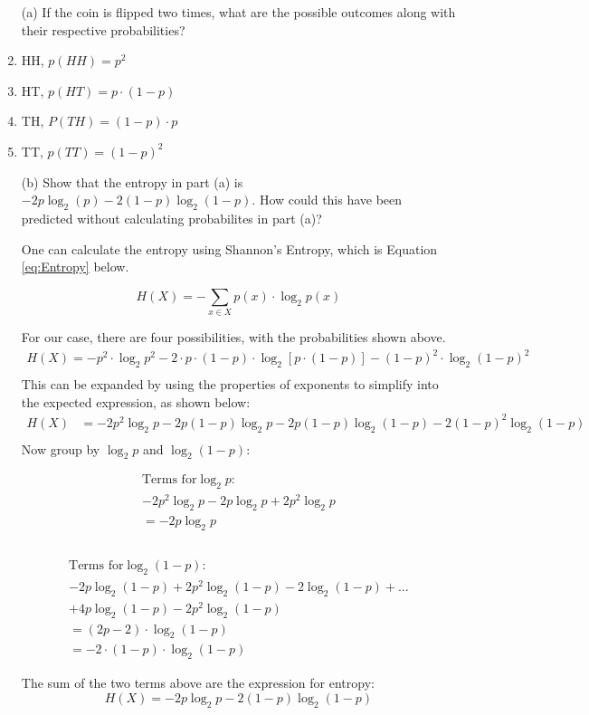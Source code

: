 \documentclass{article}
\begin{document}
    \begin{enumerate}
      \item [(a)] If the coin is flipped two times, what are the possible outcomes along with their respective probabilities?
      
      \item HH, $p(HH) = p^2$
      \item HT, $p(HT) = p \cdot (1-p)$
      \item TH, $P(TH) = (1-p) \cdot p$
      \item TT, $p(TT) = (1-p)^2$
      
      \item [(b)] Show that the entropy in part (a) is $-2p\log_2(p)-2(1-p)\log_{2}(1-p)$. How could this have been predicted without calculating probabilites in part (a)?
      
      One can calculate the entropy using Shannon's Entropy, which is Equation \ref{eq:Entropy} below.
      
      \begin{equation}
      \label{eq:Entropy}
      H(X) = - \sum_{x \in X} p(x) \cdot \log_2 p(x)
      \end{equation}

For our case, there are four possibilities, with the probabilities shown above.
	\begin{align*}
	H(X) = - p^2 \cdot \log_2 p^2 - 2 \cdot p \cdot (1-p) \cdot \log_2 [p \cdot (1-p)] - (1-p)^2 \cdot \log_2 (1-p)^2 \\
	\end{align*}
This can be expanded by using the properties of exponents to simplify into the expected expression, as shown below:
\begin{align*}
H(X) &= -2  p^2 \log_2 p - 2  p  (1-p)  \log_2 p - 2  p  (1-p) \log_2 (1-p) - 2  (1-p)^2  \log_2 (1-p) \\
\end{align*}
Now group by $\log_2p$ and $\log_2(1-p)$:

\begin{minipage}{.5\textwidth}
\begin{align*}
\text{Terms for} \log_2p:  \\ \hline
-2p^2\log_2 p -2p \log_2p + 2p^2\log_2p \\
 = -2 p \log_2p \\  
 \\
\end{align*}
\end{minipage}
\begin{minipage}{.5\textwidth}
\begin{align*}
\text{Terms for} \log_2(1-p): \\ \hline
-2p\log_2(1-p) +2p^2\log_2(1-p)-2\log_2(1-p)+ \dots \\
+ 4p\log_2(1-p)-2p^2\log_2(1-p) \\
= (2p-2) \cdot \log_2(1-p) \\
= -2 \cdot (1-p) \cdot \log_2(1-p)
\end{align*}
\end{minipage}
The sum of the two terms above are the expression for entropy:
$$ H(X) = -2  p  \log_2p - 2  (1-p)  \log_2(1-p) $$


\end{enumerate}
\end{document}
